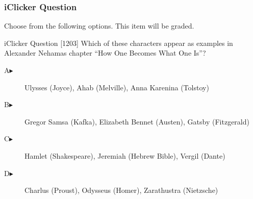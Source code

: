\begin{frame}
  \frametitle{iClicker Question}
Choose from the following options. This item will be graded.
\begin{block}{iClicker Question}
[1203] Which of these characters appear as examples in Alexander
Nehamas chapter ``How One Becomes What One Is''?
\end{block}
\begin{description}
\item[A\hspace{.2in}$\blacktriangleright$] Ulysses (Joyce), Ahab (Melville), Anna Karenina (Tolstoy)
\item[B\hspace{.2in}$\blacktriangleright$] Gregor Samsa (Kafka), Elizabeth Bennet (Austen), Gatsby (Fitzgerald)
\item[C\hspace{.2in}$\blacktriangleright$] Hamlet (Shakespeare), Jeremiah (Hebrew Bible), Vergil (Dante)
\item[D\hspace{.2in}$\blacktriangleright$] Charlus (Proust), Odysseus (Homer), Zarathustra (Nietzsche)
\end{description}
\end{frame}
